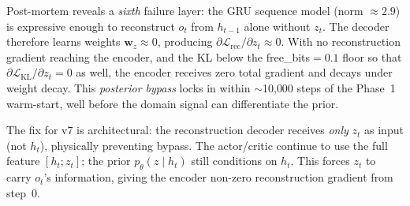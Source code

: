 \documentclass[journal,onecolumn,11pt]{IEEEtran}
\begin{document}
Post-mortem reveals a \emph{sixth} failure layer: the GRU sequence model
(norm $\approx 2.9$) is expressive enough to reconstruct $o_t$ from
$h_{t-1}$ alone without $z_t$.
The decoder therefore learns weights $\mathbf{w}_z \approx 0$, producing
$\partial \mathcal{L}_\text{rec}/\partial z_t \approx 0$.
With no reconstruction gradient reaching the encoder, and the KL
below the free\_bits$=0.1$ floor so that $\partial \mathcal{L}_\text{KL}/\partial z_t = 0$
as well, the encoder receives zero total gradient and decays under weight decay.
This \emph{posterior bypass} locks in within $\sim$10{,}000 steps of the Phase~1
warm-start, well before the domain signal can differentiate the prior.

The fix for v7 is architectural: the reconstruction decoder receives \emph{only}
$z_t$ as input (not $h_t$), physically preventing bypass.
The actor/critic continue to use the full feature $[h_t; z_t]$;
the prior $p_\theta(z \mid h_t)$ still conditions on $h_t$.
This forces $z_t$ to carry $o_t$'s information, giving the encoder
non-zero reconstruction gradient from step~0.
\end{document}
